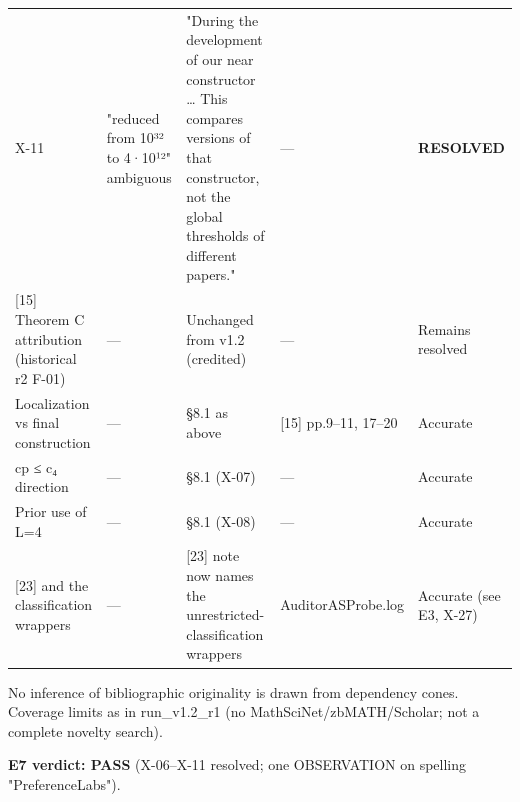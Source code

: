 \documentclass[
]{article}
\begin{document}
{\begin{longtable}[]{@{}lllll@{}}
X-11 & "reduced from 10³² to 4·10¹²" ambiguous & "During the development
of our near constructor \ldots{} This compares versions of that
constructor, not the global thresholds of different papers." & --- &
\textbf{RESOLVED} \\
{[}15{]} Theorem C attribution (historical r2 F-01) & --- & Unchanged
from v1.2 (credited) & --- & Remains resolved \\
Localization vs final construction & --- & §8.1 as above & {[}15{]}
pp.9--11, 17--20 & Accurate \\
cp ≤ c₄ direction & --- & §8.1 (X-07) & --- & Accurate \\
Prior use of L=4 & --- & §8.1 (X-08) & --- & Accurate \\
{[}23{]} and the classification wrappers & --- & {[}23{]} note now names
the unrestricted-classification wrappers & AuditorASProbe.log & Accurate
(see E3, X-27) \\
\end{longtable}
}

No inference of bibliographic originality is drawn from dependency
cones. Coverage limits as in run\_v1.2\_r1 (no
MathSciNet/zbMATH/Scholar; not a complete novelty search).

\textbf{E7 verdict: PASS} (X-06--X-11 resolved; one OBSERVATION on
spelling "PreferenceLabs").
\end{document}
